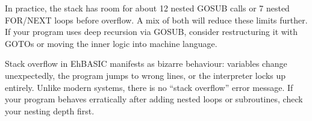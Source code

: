 \begin{tipbox}
In practice, the stack has room for about 12 nested GOSUB calls or 7 nested
FOR/NEXT loops before overflow.  A mix of both will reduce these limits
further.  If your program uses deep recursion via GOSUB, consider restructuring
it with GOTOs or moving the inner logic into machine language.
\end{tipbox}

\begin{warningbox}
Stack overflow in EhBASIC manifests as bizarre behaviour: variables change
unexpectedly, the program jumps to wrong lines, or the interpreter locks up
entirely.  Unlike modern systems, there is no ``stack overflow'' error message.
If your program behaves erratically after adding nested loops or subroutines,
check your nesting depth first.
\end{warningbox}
